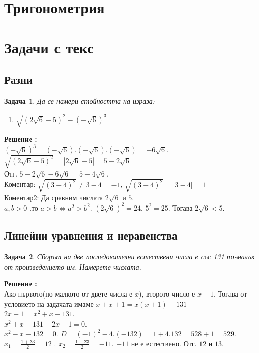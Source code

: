 \documentclass{article}
\newtheorem{problem}{Задача}
\newcounter{solution}
\newcommand\solution{%
	\stepcounter{solution}%
	\textbf{Решение :}\\%
}
\begin{document}
 


\section{Тригонометрия}


\section{Задачи с текс}

\subsection{Разни}
\begin{problem}
Да се намери стойността на израза:
\begin{enumerate}
	\item $\sqrt{(2\sqrt{6} - 5 )^2} - (-\sqrt{6})^3$
\end{enumerate}	
\end{problem}
\solution

$ (-\sqrt{6})^3 =(-\sqrt{6}).(-\sqrt{6}).(-\sqrt{6}) = -6\sqrt{6}. $ \\
$\sqrt{(2\sqrt{6} - 5 )^2} = | 2\sqrt{6} - 5 | = 5 - 2\sqrt6$ \\
Отг. $ 5 - 2\sqrt 6 - 6\sqrt{6} = 5 - 4\sqrt{6} $. \\
Коментар: $\sqrt{(3-4)^2} \neq 3-4 = -1 $, $\sqrt{(3-4)^2} = | 3-4| = 1$  \\
Коментар2: Да сравним числата $2\sqrt6$ и $5.$ \\
$a,b >0 $ ,то $a>b \iff a^2 > b^2 $. 
$(2\sqrt 6)^2 = 24$, $5^2 = 25 $. Тогава  $2\sqrt6 < 5.$

\subsection{Линейни уравнения и неравенства}

\begin{problem}
	Сборът на две последователни естествени числа е със 131 по-малък от произведението им. Намерете числата.	
\end{problem}
\solution
 Ако първото(по-малкото от двете числа е $x$), второто число е $x+1$. Тогава от условието на задачата имаме 
 $ x + x+1 = x(x+1) - 131 $ \\ $2x + 1 = x^2 + x - 131.$ \\
 $x^2 + x - 131  -2x -1 = 0.$ \\
 $ x^2 -x -132 = 0.$
$D = (-1)^2 - 4.(-132) = 1 + 4.132 = 528+1 =529.$
$x_1 = \frac{1 +23}{2} = 12 $ . $x_2 = \frac{1 - 23}{2} = -11$. $-11$ не е естествено.
Отг. $12$ и $13$.
\end{document}
